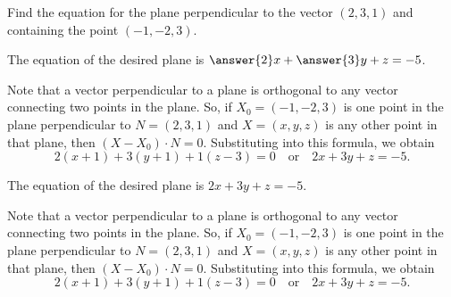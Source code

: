 \documentclass{ximera}
\begin{document}
\begin{exercise} \label{c2.2.5}
Find the equation for the plane perpendicular to the vector $(2,3,1)$
and containing the point $(-1,-2,3)$.
\begin{prompt}
  The equation of the desired plane is $\answer{2}x + \answer{3}y + z = -5$.
\end{prompt}
\begin{hint}
  Note that a vector perpendicular to a plane is orthogonal
to any vector connecting two points in the plane.  So,
if $X_0 = (-1,-2,3)$ is one point in the plane perpendicular to
$N = (2,3,1)$ and $X = (x,y,z)$ is any other point in that plane,
then $(X - X_0) \cdot N = 0$.  Substituting into this formula, we obtain
\[
2(x + 1) + 3(y + 1) + 1(z - 3) = 0\quad\mbox{or}\quad
2x + 3y + z = -5.
\]
\end{hint}

\begin{solution}

\ans The equation of the desired plane is $2x + 3y + z = -5$.

\soln Note that a vector perpendicular to a plane is orthogonal
to any vector connecting two points in the plane.  So,
if $X_0 = (-1,-2,3)$ is one point in the plane perpendicular to
$N = (2,3,1)$ and $X = (x,y,z)$ is any other point in that plane,
then $(X - X_0) \cdot N = 0$.  Substituting into this formula, we obtain
\[
2(x + 1) + 3(y + 1) + 1(z - 3) = 0\quad\mbox{or}\quad
2x + 3y + z = -5.
\]

\end{solution}
\end{exercise}
\end{document}
